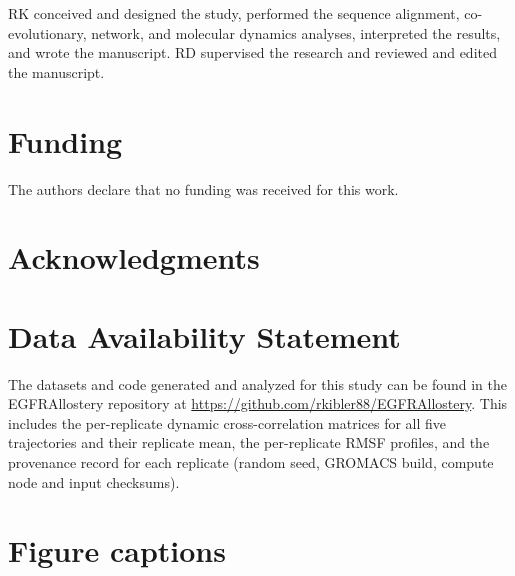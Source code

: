 \documentclass[utf8]{FrontiersinHarvard}
\begin{document}
RK conceived and designed the study, performed the sequence alignment, co-evolutionary, network, and molecular dynamics analyses, interpreted the results, and wrote the manuscript. RD supervised the research and reviewed and edited the manuscript. %

\section*{Funding}

The authors declare that no funding was received for this work.

\section*{Acknowledgments}


\section*{Data Availability Statement}

The datasets and code generated and analyzed for this study can be found in the EGFRAllostery repository at \url{https://github.com/rkibler88/EGFRAllostery}. This includes the per-replicate dynamic cross-correlation matrices for all five trajectories and their replicate mean, the per-replicate RMSF profiles, and the provenance record for each replicate (random seed, GROMACS build, compute node and input checksums).




\section*{Figure captions}
\end{document}
